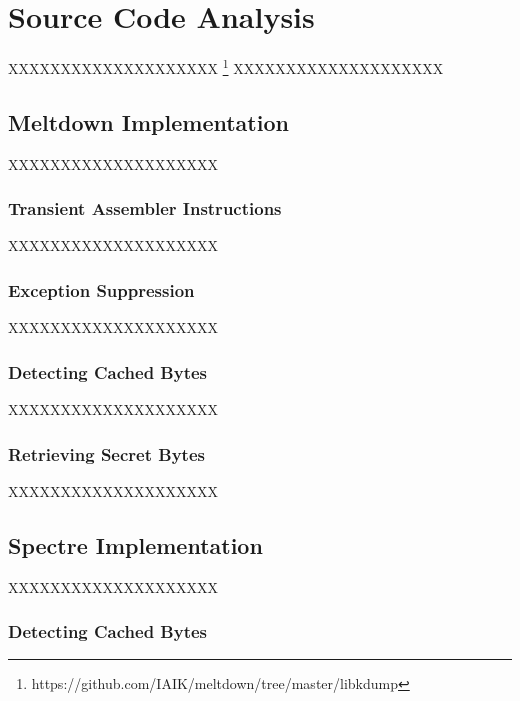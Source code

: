 \documentclass[a4paper,oneside,openright] {scrreprt}
\begin{document}
\chapter{Source Code Analysis}
\label{ch:sourceCodeAnalysis}

XXXXXXXXXXXXXXXXXXXX
\footnote{https://github.com/IAIK/meltdown/tree/master/libkdump}
XXXXXXXXXXXXXXXXXXXX

\section{Meltdown Implementation}
\label{ch:intro:motivation}

XXXXXXXXXXXXXXXXXXXX


\subsection{Transient Assembler Instructions}
\label{ch:intro:motivation:A}

XXXXXXXXXXXXXXXXXXXX

\subsection{Exception Suppression}
\label{ch:intro:motivation:A}

XXXXXXXXXXXXXXXXXXXX

\subsection{Detecting Cached Bytes}
\label{ch:intro:motivation:A}

XXXXXXXXXXXXXXXXXXXX

\subsection{Retrieving Secret Bytes}
\label{ch:intro:motivation:A}

XXXXXXXXXXXXXXXXXXXX

\section{Spectre Implementation}
\label{ch:intro:motivation}

XXXXXXXXXXXXXXXXXXXX

\subsection{Detecting Cached Bytes}
\label{ch:intro:motivation:A}
\end{document}
